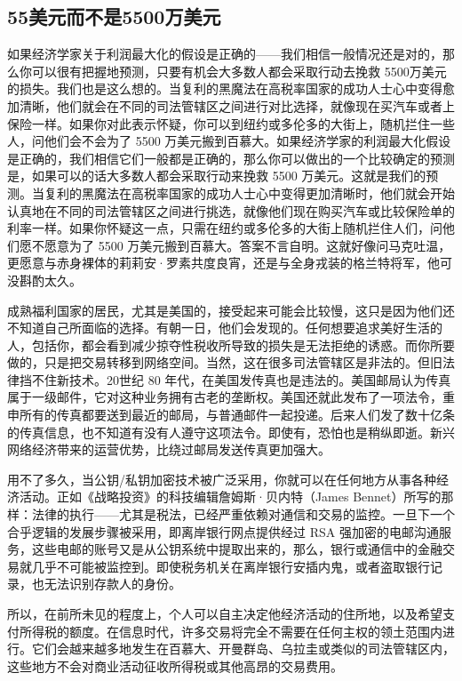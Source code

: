\subsection{55美元而不是5500万美元}
如果经济学家关于利润最大化的假设是正确的——我们相信一般情况还是对的，那么你可以很有把握地预测，只要有机会大多数人都会采取行动去挽救 5500万美元的损失。我们也是这么想的。当复利的黑魔法在高税率国家的成功人士心中变得愈加清晰，他们就会在不同的司法管辖区之间进行对比选择，就像现在买汽车或者上保险一样。如果你对此表示怀疑，你可以到纽约或多伦多的大街上，随机拦住一些人，问他们会不会为了 5500 万美元搬到百慕大。如果经济学家的利润最大化假设是正确的，我们相信它们一般都是正确的，那么你可以做出的一个比较确定的预测是，如果可以的话大多数人都会采取行动来挽救 5500 万美元。这就是我们的预测。当复利的黑魔法在高税率国家的成功人士心中变得更加清晰时，他们就会开始认真地在不同的司法管辖区之间进行挑选，就像他们现在购买汽车或比较保险单的利率一样。如果你怀疑这一点，只需在纽约或多伦多的大街上随机拦住人们，问他们愿不愿意为了 5500 万美元搬到百慕大。答案不言自明。这就好像问马克吐温，更愿意与赤身裸体的莉莉安·罗素共度良宵，还是与全身戎装的格兰特将军，他可没斟酌太久。

成熟福利国家的居民，尤其是美国的，接受起来可能会比较慢，这只是因为他们还不知道自己所面临的选择。有朝一日，他们会发现的。任何想要追求美好生活的人，包括你，都会看到减少掠夺性税收所导致的损失是无法拒绝的诱惑。而你所要做的，只是把交易转移到网络空间。当然，这在很多司法管辖区是非法的。但旧法律挡不住新技术。20世纪 80 年代，在美国发传真也是违法的。美国邮局认为传真属于一级邮件，它对这种业务拥有古老的垄断权。美国还就此发布了一项法令，重申所有的传真都要送到最近的邮局，与普通邮件一起投递。后来人们发了数十亿条的传真信息，也不知道有没有人遵守这项法令。即使有，恐怕也是稍纵即逝。新兴网络经济带来的运营优势，比绕过邮局发送传真更加强大。

用不了多久，当公钥/私钥加密技术被广泛采用，你就可以在任何地方从事各种经济活动。正如《战略投资》的科技编辑詹姆斯·贝内特（James Bennet）所写的那样：法律的执行——尤其是税法，已经严重依赖对通信和交易的监控。一旦下一个合乎逻辑的发展步骤被采用，即离岸银行网点提供经过 RSA 强加密的电邮沟通服务，这些电邮的账号又是从公钥系统中提取出来的，那么，银行或通信中的金融交易就几乎不可能被监控到。即使税务机关在离岸银行安插内鬼，或者盗取银行记录，也无法识别存款人的身份。

所以，在前所未见的程度上，个人可以自主决定他经济活动的住所地，以及希望支付所得税的额度。在信息时代，许多交易将完全不需要在任何主权的领土范围内进行。它们会越来越多地发生在百慕大、开曼群岛、乌拉圭或类似的司法管辖区内，这些地方不会对商业活动征收所得税或其他高昂的交易费用。

